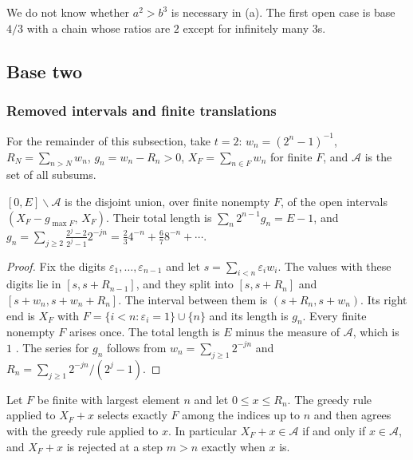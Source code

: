 \documentclass[11pt]{article}
\begin{document}
We do not know whether $a^2>b^3$ is necessary in (a).  The first open case is
base $4/3$ with a chain whose ratios are $2$ except for infinitely many $3$s.

\subsection{Base two}\label{sec:base2}

\subsubsection{Removed intervals and finite translations}\label{sec:lemmas}


For the remainder of this subsection, take $t=2$: $w_n=(2^n-1)^{-1}$,
$R_N=\sum_{n>N}w_n$, $g_n=w_n-R_n>0$, $X_F=\sum_{n\in F}w_n$ for finite $F$,
and $\mathcal A$ is the set of all subsums.

\begin{lemma}\label{lem:gaps}
$[0,E]\smallsetminus\mathcal A$ is the disjoint union, over finite nonempty $F$, of
the open intervals $(X_F-g_{\max F},\,X_F)$.  Their total length is
$\sum_n2^{n-1}g_n=E-1$, and
$g_n=\sum_{j\ge2}\frac{2^j-2}{2^j-1}2^{-jn}=\tfrac23 4^{-n}+\tfrac67 8^{-n}+\cdots$.
\end{lemma}

\begin{proof}
Fix the digits $\varepsilon_1,\dots,\varepsilon_{n-1}$ and let
$s=\sum_{i<n}\varepsilon_iw_i$.
The values with these digits lie in $[s,s+R_{n-1}]$, and they split into
$[s,s+R_n]$ and $[s+w_n,s+w_n+R_n]$.  The interval between them is
$(s+R_n,s+w_n)$.  Its right end is $X_F$ with
$F=\{i<n:\varepsilon_i=1\}\cup\{n\}$ and its length is $g_n$.  Every finite
nonempty $F$ arises once.  The total length is $E$ minus the measure of
$\mathcal A$, which is $1$ \cite[Section~7]{plectis257}.  The series for $g_n$
follows from $w_n=\sum_{j\ge1}2^{-jn}$ and
$R_n=\sum_{j\ge1}2^{-jn}/(2^j-1)$.
\end{proof}

\begin{lemma}\label{lem:translate}
Let $F$ be finite with largest element $n$ and let $0\le x\le R_n$.  The greedy
rule applied to $X_F+x$ selects exactly $F$ among the indices up to $n$ and then
agrees with the greedy rule applied to $x$.  In particular $X_F+x\in\mathcal A$
if and only if $x\in\mathcal A$, and $X_F+x$ is rejected at a step $m>n$ exactly
when $x$ is.
\end{lemma}
\end{document}

